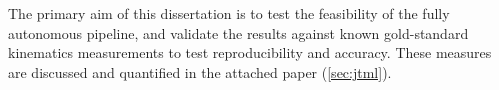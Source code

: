 The primary aim of this dissertation is to test the feasibility of the fully autonomous pipeline, and validate the results against known gold-standard kinematics measurements to test reproducibility and accuracy. These measures are discussed and quantified in the attached paper (\cref{sec:jtml}).